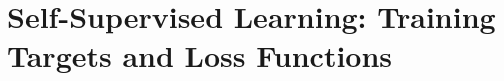 \documentclass[10pt,twocolumn,letterpaper]{article}
\begin{document}






\section{Self-Supervised Learning: Training Targets and Loss Functions}\label{sec:ssl}

\end{document}
